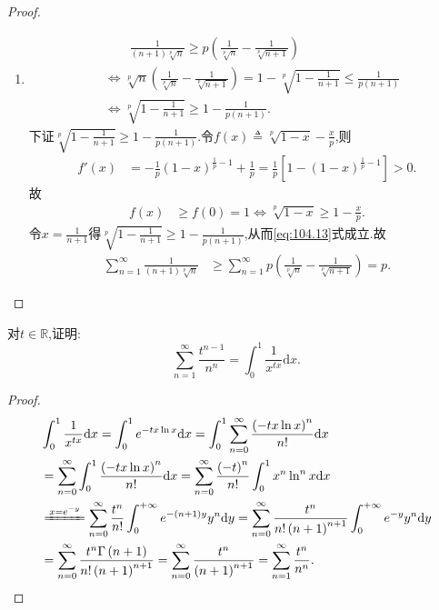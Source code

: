 \documentclass[../../main.tex]{subfiles}
\begin{document}
\begin{proof}
\begin{enumerate}
\item \begin{align}
&\quad \quad \frac{1}{\left( n+1 \right) \sqrt[p]{n}}\geqslant p\left( \frac{1}{\sqrt[p]{n}}-\frac{1}{\sqrt[p]{n+1}} \right) \label{eq:104.13} \\
&\Longleftrightarrow \sqrt[p]{n}\left( \frac{1}{\sqrt[p]{n}}-\frac{1}{\sqrt[p]{n+1}} \right) =1-\sqrt[p]{1-\frac{1}{n+1}}\leqslant \frac{1}{p\left( n+1 \right)}\nonumber \\
&\Longleftrightarrow \sqrt[p]{1-\frac{1}{n+1}}\geqslant 1-\frac{1}{p\left( n+1 \right)}.\nonumber
\end{align}
下证$\sqrt[p]{1-\frac{1}{n+1}}\geqslant 1-\frac{1}{p\left( n+1 \right)}$.令$f\left( x \right) \triangleq \sqrt[p]{1-x}-\frac{x}{p}$,则
\begin{align*}
f\prime \left( x \right) &=-\frac{1}{p}\left( 1-x \right) ^{\frac{1}{p}-1}+\frac{1}{p}=\frac{1}{p}\left[ 1-\left( 1-x \right) ^{\frac{1}{p}-1} \right] >0.
\end{align*}
故
\begin{align*}
f\left( x \right) &\geqslant f\left( 0 \right) =1\Longleftrightarrow \sqrt[p]{1-x}\geqslant 1-\frac{x}{p}.
\end{align*}
令$x=\frac{1}{n+1}$得$\sqrt[p]{1-\frac{1}{n+1}}\geqslant 1-\frac{1}{p\left( n+1 \right)}$,从而\eqref{eq:104.13}式成立.故
\begin{align*}
\sum_{n=1}^{\infty}{\frac{1}{\left( n+1 \right) \sqrt[p]{n}}}&\geqslant \sum_{n=1}^{\infty}{p\left( \frac{1}{\sqrt[p]{n}}-\frac{1}{\sqrt[p]{n+1}} \right)}=p.
\end{align*}
\end{enumerate}
\end{proof}

\begin{example}
对$t \in \mathbb{R}$,证明:
$$\sum_{n=1}^\infty \frac{t^{n-1}}{n^n}=\int_0^1 \frac{1}{x^{tx}}\mathrm{d}x.$$
\end{example}
\begin{proof}
\begin{align*}
&\int_0^1{\frac{1}{x^{tx}}\mathrm{d}x}=\int_0^1{e^{-tx\ln x}\mathrm{d}x}=\int_0^1{\sum_{n=0}^{\infty}{\frac{\left( -tx\ln x \right) ^n}{n!}\mathrm{d}x}}
\\
&=\sum_{n=0}^{\infty}{\int_0^1{\frac{\left( -tx\ln x \right) ^n}{n!}\mathrm{d}x}}=\sum_{n=0}^{\infty}{\frac{\left( -t \right) ^n}{n!}\int_0^1{x^n\ln ^nx\mathrm{d}x}}
\\
&\xlongequal{x=e^{-y}}\sum_{n=0}^{\infty}{\frac{t^n}{n!}\int_0^{+\infty}{e^{-\left( n+1 \right) y}y^n\mathrm{d}y}}=\sum_{n=0}^{\infty}{\frac{t^n}{n!\left( n+1 \right) ^{n+1}}\int_0^{+\infty}{e^{-y}y^n\mathrm{d}y}}
\\
&=\sum_{n=0}^{\infty}{\frac{t^n\Gamma \left( n+1 \right)}{n!\left( n+1 \right) ^{n+1}}}=\sum_{n=0}^{\infty}{\frac{t^n}{\left( n+1 \right) ^{n+1}}}=\sum_{n=1}^{\infty}{\frac{t^n}{n^n}}.
\end{align*}
\end{proof}
\end{document}
